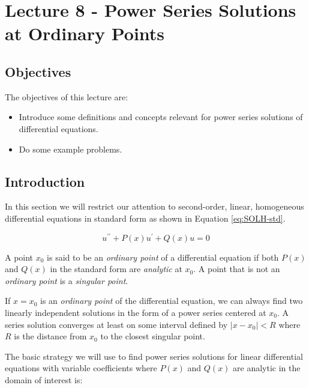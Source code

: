 \chapter{Lecture 8 - Power Series Solutions at Ordinary Points}
\label{ch:lec8}
\section{Objectives}
The objectives of this lecture are:
\begin{itemize}
\item Introduce some definitions and concepts relevant for power series solutions of differential equations.
\item Do some example problems.
\end{itemize}

\section{Introduction}
In this section we will restrict our attention to second-order, linear, homogeneous differential equations in standard form as shown in Equation \ref{eq:SOLH-std}.

\begin{equation}
u^{\prime \prime}+P(x)u^{\prime}+Q(x)u=0
\label{eq:SOLH-std}
\end{equation}

 
\begin{definition}
A point $x_0$ is said to be an \emph{ordinary point} of a differential equation if both $P(x)$ and $Q(x)$ in the standard form are \emph{analytic} at $x_0$.  A point that is not an \emph{ordinary point} is a \emph{singular point}.
\end{definition}


\begin{theorem}
If $x=x_0$ is an \emph{ordinary point} of the differential equation, we can always find two linearly independent solutions in the form of a power series centered at $x_0$.  A series solution converges at least on some interval defined by $\left| x - x_0 \right|<R$ where $R$ is the distance from $x_0$ to the closest singular point.
\label{thm:existence-of-power-series-solutions}
\end{theorem}

The basic strategy we will use to find power series solutions for linear differential equations with variable coefficients where $P(x)$ and $Q(x)$ are analytic in the domain of interest is:

